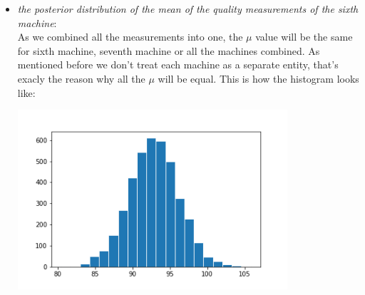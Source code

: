 \documentclass[11pt,a4paper,english]{article}
\begin{document}
          \begin{itemize}
            \item \textit{the posterior distribution of the mean of the quality measurements of the sixth machine}: \\
              As we combined all the measurements into one, the $\mu$ value will be the same for sixth machine, seventh machine or all the machines combined. As mentioned before we don't treat each machine as a separate entity, that's exacly the reason why all the $\mu$ will be equal. This is how the histogram looks like:
              \begin{center}
                \includegraphics[width=10cm]{pooled_hist_mu.png}
              \end{center}


\end{itemize}
\end{document}
